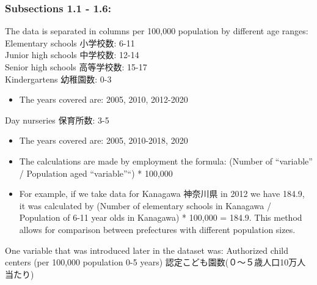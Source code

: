 \documentclass[
]{ltjarticle}
\providecommand{\tightlist}{%
  \setlength{\itemsep}{0pt}\setlength{\parskip}{0pt}}\usepackage{longtable,booktabs,array}
\begin{document}
\hypertarget{subsections-1.1---1.6}{%
\subsubsection{Subsections 1.1 - 1.6:}\label{subsections-1.1---1.6}}

The data is separated in columns per 100,000 population by different age
ranges:\\
Elementary schools 小学校数: 6-11\\
Junior high schools 中学校数: 12-14\\
Senior high schools 高等学校数: 15-17\\
Kindergartens 幼稚園数: 0-3\\

\begin{itemize}
\tightlist
\item
  The years covered are: 2005, 2010, 2012-2020
\end{itemize}

Day nurseries 保育所数: 3-5\\

\begin{itemize}
\item
  The years covered are: 2005, 2010-2018, 2020
\item
  The calculations are made by employment the formula: (Number of
  ``variable'' / Population aged ``variable''``) * 100,000
\item
  For example, if we take data for Kanagawa 神奈川県 in 2012 we have
  184.9, it was calculated by (Number of elementary schools in Kanagawa
  / Population of 6-11 year olds in Kanagawa) * 100,000 = 184.9. This
  method allows for comparison between prefectures with different
  population sizes.
\end{itemize}

One variable that was introduced later in the dataset was: Authorized
child centers (per 100,000 population 0-5 years)
認定こども園数(０～５歳人口10万人当たり)\\
\end{document}
